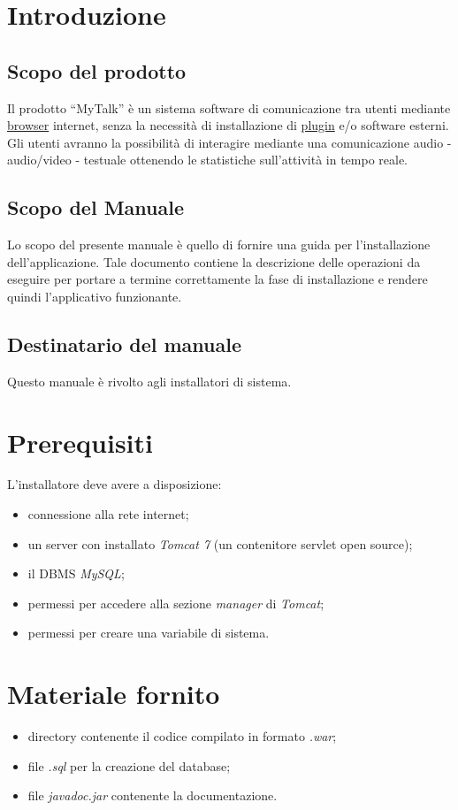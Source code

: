 \section{Introduzione}
\subsection{Scopo del prodotto}
Il prodotto ``MyTalk'' è un sistema software di comunicazione tra utenti mediante \underline{browser} internet, senza la necessità di installazione di \underline{plugin} e/o software esterni. Gli utenti avranno la possibilità di interagire mediante una comunicazione audio - audio/video - testuale ottenendo le statistiche sull'attività in tempo reale.

\subsection{Scopo del Manuale}
Lo scopo del presente manuale è quello di fornire una guida per l'installazione dell'applicazione. Tale documento contiene la descrizione delle operazioni da eseguire per portare a termine correttamente la fase di installazione e rendere quindi l'applicativo funzionante.

\subsection{Destinatario del manuale}
Questo manuale è rivolto agli installatori di sistema.

\section{Prerequisiti}
L'installatore deve avere a disposizione:
\begin{itemize}
\item connessione alla rete internet;
\item un server con installato \textit{Tomcat 7} (un contenitore servlet open source);
\item il DBMS \textit{MySQL};
\item permessi per accedere alla sezione \textit{manager} di \textit{Tomcat};
\item permessi per creare una variabile di sistema.
\end{itemize} 

\section{Materiale fornito}
\begin{itemize}
\item directory \caName contenente il codice compilato in formato \textit{.war};
\item file \textit{.sql} per la creazione del database;
\item file \textit{javadoc.jar} contenente la documentazione.
\end{itemize}

